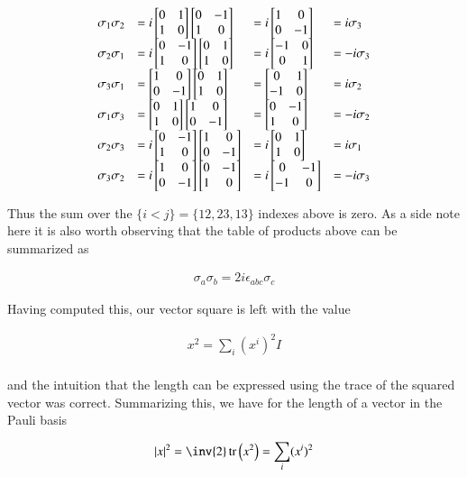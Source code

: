 \documentclass{article}
\DeclareMathOperator{\tr}{tr}
\newcommand{\traceB}[1]{\tr\left({#1}\right)}
\newcommand{\PauliX}[0]{
\begin{bmatrix}
0 & 1 \\
1 & 0 \\
\end{bmatrix}
}
\newcommand{\PauliYNoI}[0]{
\begin{bmatrix}
0 & -1 \\
1 & 0 \\
\end{bmatrix}
}
\newcommand{\PauliZ}[0]{
\begin{bmatrix}
1 & 0 \\
0 & -1 \\
\end{bmatrix}
}
\begin{document}
\begin{align*}
\begin{array}{l l l l}
\sigma_1 \sigma_2 &= i \PauliX \PauliYNoI    &= i \PauliZ                                  &=  i \sigma_3 \\
\sigma_2 \sigma_1 &= i \PauliYNoI \PauliX    &= i \begin{bmatrix}-1 & 0 \\0 & 1\end{bmatrix} &= -i \sigma_3 \\
\sigma_3 \sigma_1 &= \PauliZ \PauliX         &=   \begin{bmatrix}0 & 1 \\-1 & 0\end{bmatrix} &=  i \sigma_2 \\
\sigma_1 \sigma_3 &= \PauliX \PauliZ         &=   \begin{bmatrix}0 & -1 \\1 & 0\end{bmatrix} &= -i \sigma_2 \\
\sigma_2 \sigma_3 &= i \PauliYNoI \PauliZ    &= i \PauliX                                  &=  i \sigma_1 \\
\sigma_3 \sigma_2 &= i \PauliZ \PauliYNoI    &= i \begin{bmatrix}0 & -1 \\-1 & 0\end{bmatrix} &= -i \sigma_3 \\
\end{array}
\end{align*}

Thus the sum over the $\{i < j\} = \{12, 23, 13\}$ indexes above is zero.  As a side note here it is also worth observing that
the table of products above can be summarized as

\begin{align}
\sigma_a \sigma_b = 2 i \epsilon_{abc} \sigma_c
\end{align}

Having computed this, our vector square is left with the value

\begin{align*}
x^2 = \sum_i (x^i)^2 I \\
\end{align*}

and the intuition that the length can be expressed using the trace of the squared vector was correct.  Summarizing this, we have for the length of a vector in the Pauli basis

\begin{align}
\Abs{x}^2 = \inv{2} \traceB{x^2} = \sum_i (x^i)^2
\end{align}
\end{document}
